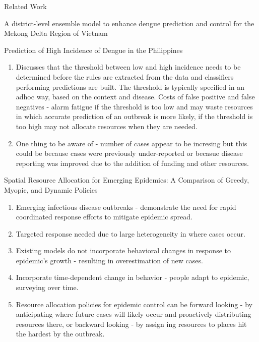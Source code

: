 \documentclass{article}
\theoremstyle{definition}
\theoremstyle{plain}
\theoremstyle{remark}
\begin{document}
\begin{section}{Related Work}
\begin{subsection}{A district-level ensemble model to enhance dengue prediction and control for the Mekong Delta Region of Vietnam}
\end{subsection}

\begin{subsection}{Prediction of High Incidence of Dengue in the Philippines}

\begin{enumerate}
  \item Discusses that the threshold between low and high incidence needs to be determined before the rules are extracted from the data and classifiers performing predictions are built. The threshold is typically specified in an adhoc way, based on the context and disease. Costs of false positive and false negatives - alarm fatigue if the threshold is too low and may waste resources in which accurate prediction of an outbreak is more likely, if the threshold is too high may not allocate resources when they are needed.
  \item One thing to be aware of - number of cases appear to be incresing but this could be because cases were previously under-reported or becasue disease reporting was improved due to the addition of funding and other resources.
\end{enumerate}

\end{subsection}

\begin{subsection}{Spatial Resource Allocation for Emerging Epidemics: A Comparison of Greedy, Myopic, and Dynamic Policies}

\begin{enumerate}
  \item Emerging infectious disease outbreaks - demonstrate the need for rapid coordinated response efforts to mitigate epidemic spread.
  \item Targeted response needed due to large heterogeneity in where cases occur. 
  \item Existing models do not incorporate behavioral changes in response to epidemic's growth - resulting in overestimation of new cases.
  \item Incorporate time-dependent change in behavior - people adapt to epidemic, surveying over time.
  \item Resource allocation policies for epidemic control can be forward looking - by anticipating where future cases will likely occur and proactively distributing resources there, or backward looking - by assign ing resources to places hit the hardest by the outbreak.
\end{enumerate}

\end{subsection}


\end{section}
\end{document}
